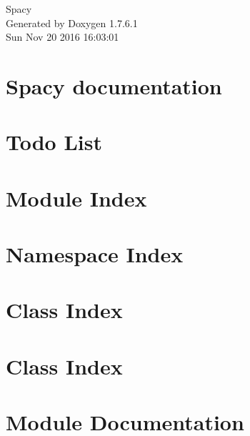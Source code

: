 \documentclass[a4paper]{book}
\begin{document}
\hypersetup{pageanchor=false,citecolor=blue}
\begin{titlepage}
\vspace*{7cm}
\begin{center}
{\Large \-Spacy }\\
\vspace*{1cm}
{\large \-Generated by Doxygen 1.7.6.1}\\
\vspace*{0.5cm}
{\small Sun Nov 20 2016 16:03:01}\\
\end{center}
\end{titlepage}
\clearemptydoublepage
{}
\tableofcontents
\clearemptydoublepage
{}
\hypersetup{pageanchor=true,citecolor=blue}
\chapter{\-Spacy documentation}
\label{index}\hypertarget{index}{}
\chapter{\-Todo \-List}
\label{todo}
\hypertarget{todo}{}

\chapter{\-Module \-Index}

\chapter{\-Namespace \-Index}

\chapter{\-Class \-Index}

\chapter{\-Class \-Index}

\chapter{\-Module \-Documentation}














\end{document}
